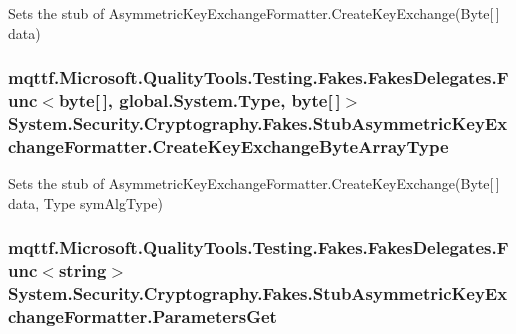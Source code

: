 Sets the stub of Asymmetric\-Key\-Exchange\-Formatter.\-Create\-Key\-Exchange(\-Byte\mbox{[}$\,$\mbox{]} data)

\hypertarget{class_system_1_1_security_1_1_cryptography_1_1_fakes_1_1_stub_asymmetric_key_exchange_formatter_a5836ed631a416b9efb56d5c253fdbe05}{
\subsubsection[{Create\-Key\-Exchange\-Byte\-Array\-Type}]{\setlength{\rightskip}{0pt plus 5cm}mqttf.\-Microsoft.\-Quality\-Tools.\-Testing.\-Fakes.\-Fakes\-Delegates.\-Func$<$byte\mbox{[}$\,$\mbox{]}, global.\-System.\-Type, byte\mbox{[}$\,$\mbox{]}$>$ System.\-Security.\-Cryptography.\-Fakes.\-Stub\-Asymmetric\-Key\-Exchange\-Formatter.\-Create\-Key\-Exchange\-Byte\-Array\-Type}}\label{class_system_1_1_security_1_1_cryptography_1_1_fakes_1_1_stub_asymmetric_key_exchange_formatter_a5836ed631a416b9efb56d5c253fdbe05}


Sets the stub of Asymmetric\-Key\-Exchange\-Formatter.\-Create\-Key\-Exchange(\-Byte\mbox{[}$\,$\mbox{]} data, Type sym\-Alg\-Type)

\hypertarget{class_system_1_1_security_1_1_cryptography_1_1_fakes_1_1_stub_asymmetric_key_exchange_formatter_af4415a202b7c8385e5e1d493a625774f}{
\subsubsection[{Parameters\-Get}]{\setlength{\rightskip}{0pt plus 5cm}mqttf.\-Microsoft.\-Quality\-Tools.\-Testing.\-Fakes.\-Fakes\-Delegates.\-Func$<$string$>$ System.\-Security.\-Cryptography.\-Fakes.\-Stub\-Asymmetric\-Key\-Exchange\-Formatter.\-Parameters\-Get}}\label{class_system_1_1_security_1_1_cryptography_1_1_fakes_1_1_stub_asymmetric_key_exchange_formatter_af4415a202b7c8385e5e1d493a625774f}


